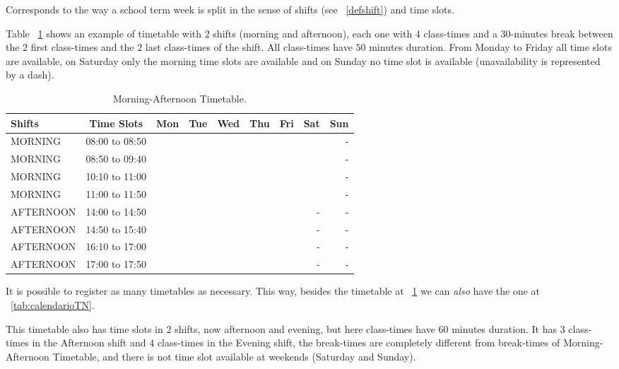 Corresponds to the way a school term week is split in the sense of shifts (see ~\ref{defshift}) and time slots.

Table ~\ref{tab:calendarioMT} shows an example of timetable with $2$ shifts (morning and afternoon), each one with $4$ class-times and a 30-minutes break between the $2$ first class-times and the $2$ last class-times of the shift. All class-times have $50$ minutes duration. From Monday to Friday all time slots are available, on Saturday only the morning time slots are available and on Sunday no time slot is available (unavailability is represented by a dash).

\begin{table}[H]
\centering
\begin{tabular}{l|c|r|r|r|r|r|r|r}
Shifts & Time Slots & Mon & Tue & Wed & Thu & Fri & Sat & Sun \\\hline
MORNING & 08:00 to 08:50 & & & & & & & - \\
MORNING & 08:50 to 09:40 & & & & & & & - \\
MORNING & 10:10 to 11:00 & & & & & & & - \\
MORNING & 11:00 to 11:50 & & & & & & & - \\
AFTERNOON & 14:00 to 14:50 & & & & & & - & - \\
AFTERNOON & 14:50 to 15:40 & & & & & & - & - \\
AFTERNOON & 16:10 to 17:00 & & & & & & - & - \\
AFTERNOON & 17:00 to 17:50 & & & & & & - & -
\end{tabular}
\caption{\label{tab:calendarioMT}Morning-Afternoon Timetable.}
\end{table}

It is possible to register as many timetables as necessary. This way, besides the timetable at ~\ref{tab:calendarioMT} we can \textit{also} have the one at ~\ref{tab:calendarioTN}. 

This timetable also has time slots in $2$ shifts, now afternoon and evening, but here class-times have $60$ minutes duration. It has $3$ class-times in the Afternoon shift and $4$ class-times in the Evening shift, the break-times are completely different from break-times of Morning-Afternoon Timetable, and there is not time slot available at weekends (Saturday and Sunday).


